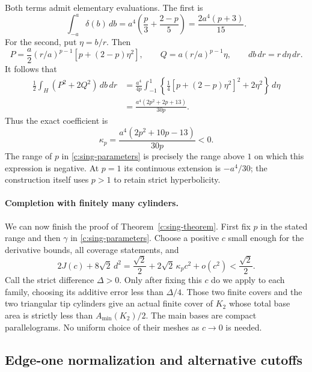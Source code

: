 Both terms admit elementary evaluations.  The first is
\[
 \int_{-a}^a\delta(b)\,db
   =a^4\left(\frac p3+\frac{2-p}{5}\right)
   =\frac{2a^4(p+3)}{15}.
\]
For the second, put $\eta=b/r$.  Then
\[
 P=\frac a2(r/a)^{p-1}[p+(2-p)\eta^2],\qquad
 Q=a(r/a)^{p-1}\eta,\qquad db\,dr=r\,d\eta\,dr.
\]
It follows that
\begin{align*}
 \frac12\int_H(P^2+2Q^2)\,db\,dr
 &=\frac{a^4}{4p}\int_{-1}^{1}
          \left\{\frac14[p+(2-p)\eta^2]^2+2\eta^2\right\}\,d\eta\\
 &=\frac{a^4(2p^2+2p+13)}{30p}.
\end{align*}
Thus the exact coefficient is
\begin{equation}
 \boxed{\displaystyle
 \kappa_p=\frac{a^4(2p^2+10p-13)}{30p}<0.}
 \label{c:sing-coefficient}
\end{equation}
The range of $p$ in \eqref{c:sing-parameters} is precisely the
range above $1$ on which this expression is negative.  At $p=1$
its continuous extension is $-a^4/30$; the construction itself uses
$p>1$ to retain strict hyperbolicity.

\paragraph{Completion with finitely many cylinders.}
We can now finish the proof of Theorem~\ref{c:sing-theorem}.  First fix $p$ in the stated
range and then $\gamma$ in \eqref{c:sing-parameters}.
Choose a positive $c$ small enough for the derivative bounds, all
coverage statements, and
\[
 2J(c)+8\sqrt{2}\,d^2
  =\frac{\sqrt{2}}2+2\sqrt{2}\,\kappa_p c^2+o(c^2)
  <\frac{\sqrt{2}}2.
\]
Call the strict difference $\Delta>0$.
Only after fixing this $c$ do we apply
\BScaling{} to each family, choosing
its additive error less than $\Delta/4$.
Those two finite covers and the two triangular tip cylinders give
an actual finite cover of $K_2$ whose total base area is strictly less
than $A_{\min}(K_2)/2$.  The main bases are compact parallelograms.
No uniform choice of their meshes as $c\to0$ is needed.

\subsection{Edge-one normalization and alternative cutoffs}
\label{c:sing-edge-one}

